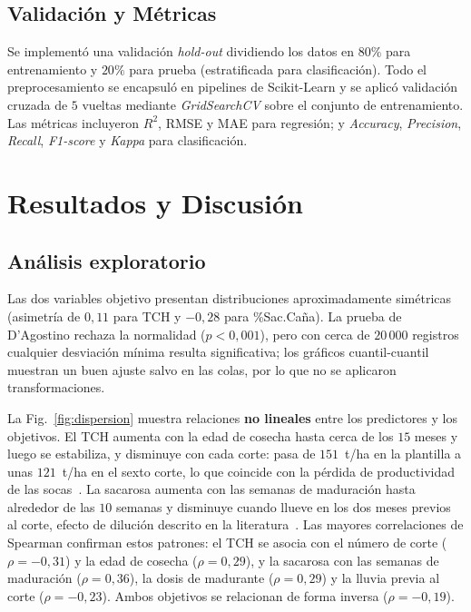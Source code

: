 \documentclass[conference]{IEEEtran}
\begin{document}
\subsection{Validación y Métricas}
Se implementó una validación \textit{hold-out} dividiendo los datos en $80\%$ para entrenamiento y $20\%$ para prueba (estratificada para clasificación). Todo el preprocesamiento se encapsuló en pipelines de Scikit-Learn y se aplicó validación cruzada de $5$ vueltas mediante \textit{GridSearchCV} sobre el conjunto de entrenamiento. Las métricas incluyeron $R^2$, RMSE y MAE para regresión; y \textit{Accuracy}, \textit{Precision}, \textit{Recall}, \textit{F1-score} y \textit{Kappa} para clasificación.

\section{Resultados y Discusión}

\subsection{Análisis exploratorio}
Las dos variables objetivo presentan distribuciones aproximadamente simétricas (asimetría de $0{,}11$ para TCH y $-0{,}28$ para \%Sac.Caña). La prueba de D'Agostino rechaza la normalidad ($p<0{,}001$), pero con cerca de $20\,000$ registros cualquier desviación mínima resulta significativa; los gráficos cuantil-cuantil muestran un buen ajuste salvo en las colas, por lo que no se aplicaron transformaciones.

La Fig.~\ref{fig:dispersion} muestra relaciones \textbf{no lineales} entre los predictores y los objetivos. El TCH aumenta con la edad de cosecha hasta cerca de los $15$ meses y luego se estabiliza, y disminuye con cada corte: pasa de $151$~t/ha en la plantilla a unas $121$~t/ha en el sexto corte, lo que coincide con la pérdida de productividad de las socas~\cite{cenicana}. La sacarosa aumenta con las semanas de maduración hasta alrededor de las $10$ semanas y disminuye cuando llueve en los dos meses previos al corte, efecto de dilución descrito en la literatura~\cite{cenicana}. Las mayores correlaciones de Spearman confirman estos patrones: el TCH se asocia con el número de corte ($\rho=-0{,}31$) y la edad de cosecha ($\rho=0{,}29$), y la sacarosa con las semanas de maduración ($\rho=0{,}36$), la dosis de madurante ($\rho=0{,}29$) y la lluvia previa al corte ($\rho=-0{,}23$). Ambos objetivos se relacionan de forma inversa ($\rho=-0{,}19$).
\end{document}
